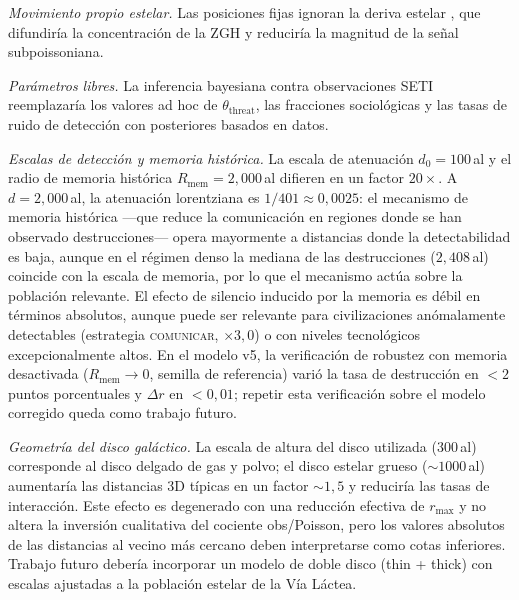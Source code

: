 \documentclass[useAMS,usenatbib,onecolumn]{mn2e}
\begin{document}
\textit{Movimiento propio estelar.}
Las posiciones fijas ignoran la deriva estelar
\citep[$\sim 30$\,km\,s$^{-1}$;][]{carrollnellenback2019},
que difundiría la concentración de la ZGH y reduciría la magnitud de
la señal subpoissoniana.

\textit{Parámetros libres.}
La inferencia bayesiana contra observaciones SETI reemplazaría los
valores ad hoc de $\theta_\text{threat}$, las fracciones sociológicas
y las tasas de ruido de detección con posteriores basados en datos.

\textit{Escalas de detección y memoria histórica.}
La escala de atenuación $d_0 = 100$\,al y el radio de memoria histórica
$R_\text{mem} = 2{,}000$\,al difieren en un factor $20\times$.
A $d = 2{,}000$\,al, la atenuación lorentziana es $1/401 \approx
0{,}0025$: el mecanismo de memoria histórica —que reduce la
comunicación en regiones donde se han observado destrucciones— opera
mayormente a distancias donde la detectabilidad es baja, aunque en el
régimen denso la mediana de las destrucciones ($2{,}408$\,al) coincide
con la escala de memoria, por lo que el mecanismo actúa sobre la
población relevante.
El efecto de silencio inducido por la memoria es débil en términos
absolutos, aunque puede ser relevante para civilizaciones
anómalamente detectables (estrategia \textsc{comunicar}, $\times 3{,}0$)
o con niveles tecnológicos excepcionalmente altos.
En el modelo v5, la verificación de robustez con memoria desactivada
($R_\text{mem} \to 0$, semilla de referencia) varió la tasa de
destrucción en $< 2$ puntos porcentuales y $\Delta r$ en $< 0{,}01$;
repetir esta verificación sobre el modelo corregido queda como trabajo
futuro.

\textit{Geometría del disco galáctico.}
La escala de altura del disco utilizada (300\,al) corresponde al disco
delgado de gas y polvo; el disco estelar grueso ($\sim 1000$\,al)
aumentaría las distancias 3D típicas en un factor $\sim 1{,}5$ y
reduciría las tasas de interacción.
Este efecto es degenerado con una reducción efectiva de $r_\text{max}$
y no altera la inversión cualitativa del cociente obs/Poisson, pero
los valores absolutos de las distancias al vecino más cercano deben
interpretarse como cotas inferiores.
Trabajo futuro debería incorporar un modelo de doble disco (thin + thick)
con escalas ajustadas a la población estelar de la Vía Láctea.
\end{document}
